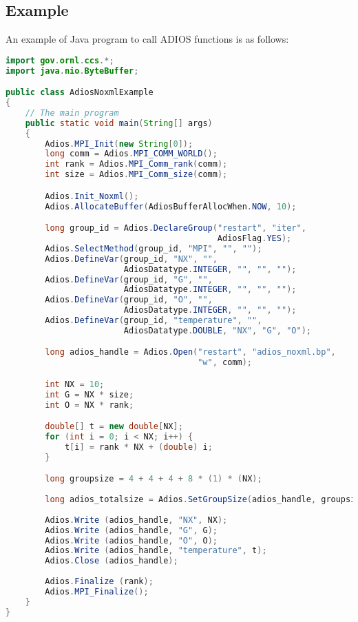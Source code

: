 \subsection{Example}
An example of Java program to call ADIOS functions is as follows:
\begin{lstlisting}[language=Java,caption={Example Java wrapper code},label={}]
import gov.ornl.ccs.*;
import java.nio.ByteBuffer;

public class AdiosNoxmlExample
{
    // The main program
    public static void main(String[] args)
    {
        Adios.MPI_Init(new String[0]);
        long comm = Adios.MPI_COMM_WORLD();
        int rank = Adios.MPI_Comm_rank(comm);
        int size = Adios.MPI_Comm_size(comm);

        Adios.Init_Noxml();
        Adios.AllocateBuffer(AdiosBufferAllocWhen.NOW, 10);

        long group_id = Adios.DeclareGroup("restart", "iter", 
                                           AdiosFlag.YES);
        Adios.SelectMethod(group_id, "MPI", "", "");
        Adios.DefineVar(group_id, "NX", "", 
                        AdiosDatatype.INTEGER, "", "", "");
        Adios.DefineVar(group_id, "G", "", 
                        AdiosDatatype.INTEGER, "", "", "");
        Adios.DefineVar(group_id, "O", "", 
                        AdiosDatatype.INTEGER, "", "", "");
        Adios.DefineVar(group_id, "temperature", "", 
                        AdiosDatatype.DOUBLE, "NX", "G", "O");

        long adios_handle = Adios.Open("restart", "adios_noxml.bp", 
                                       "w", comm);

        int NX = 10; 
        int G = NX * size;
        int O = NX * rank;

        double[] t = new double[NX];
        for (int i = 0; i < NX; i++) {
            t[i] = rank * NX + (double) i;
        }

        long groupsize = 4 + 4 + 4 + 8 * (1) * (NX);
        
        long adios_totalsize = Adios.SetGroupSize(adios_handle, groupsize);
        
        Adios.Write (adios_handle, "NX", NX);
        Adios.Write (adios_handle, "G", G);
        Adios.Write (adios_handle, "O", O);
        Adios.Write (adios_handle, "temperature", t);
        Adios.Close (adios_handle);
        
        Adios.Finalize (rank);        
        Adios.MPI_Finalize();
    }
}
\end{lstlisting}

